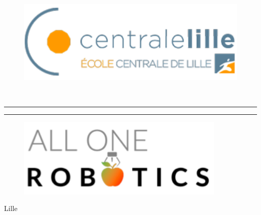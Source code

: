 \begin{titlepage}

\newcommand{\HRule}{\rule{\linewidth}{0.5mm}} 

\center 

\begin{figure}
\centerline{\includegraphics[width=12cm]{Images/Centrale_logo.png}}
\end{figure}

\vspace{3.0cm}


\textsc{\Large \MyClass}\\ 

\vspace{0.5cm}


\hrule
\vspace{0.4cm}
{\huge \bfseries \MyTitle}
\vspace{0.4cm}
\hrule

\vspace{1.5cm}

\MyAuthor

\vfill
\begin{figure}[H]
\centerline{\includegraphics[width=10cm]{Images/AllOneRobotics_logo.png}}
\end{figure}

\vfill

\flushleft
Lille

\end{titlepage}
